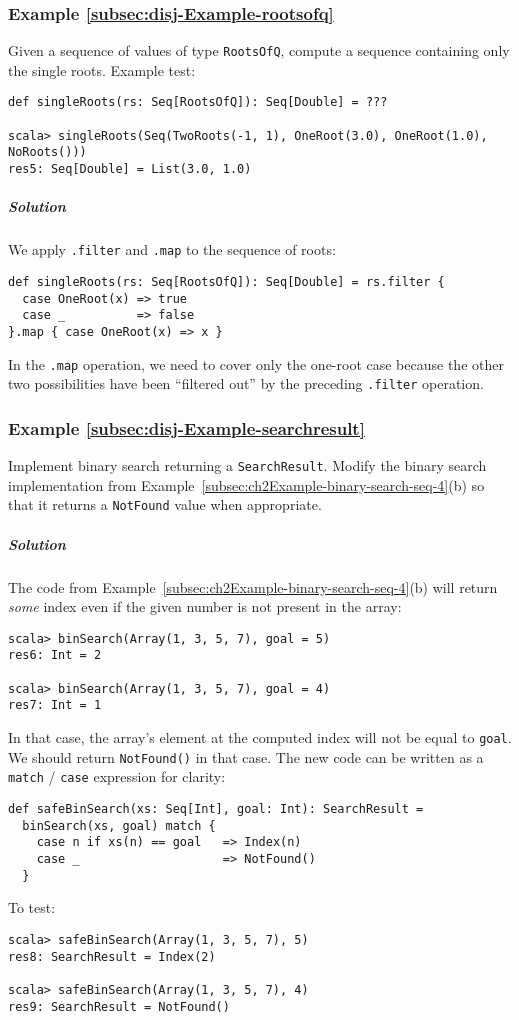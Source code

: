 \subsubsection{Example \label{subsec:disj-Example-rootsofq}\ref{subsec:disj-Example-rootsofq}}

Given a sequence of values of type \lstinline!RootsOfQ!, compute
a sequence containing only the single roots. Example test:
\begin{lstlisting}
def singleRoots(rs: Seq[RootsOfQ]): Seq[Double] = ???

scala> singleRoots(Seq(TwoRoots(-1, 1), OneRoot(3.0), OneRoot(1.0), NoRoots()))
res5: Seq[Double] = List(3.0, 1.0) 
\end{lstlisting}


\subparagraph{Solution}

We apply \lstinline!.filter! and \lstinline!.map! to the sequence
of roots:
\begin{lstlisting}
def singleRoots(rs: Seq[RootsOfQ]): Seq[Double] = rs.filter {
  case OneRoot(x) => true
  case _          => false
}.map { case OneRoot(x) => x }
\end{lstlisting}
In the \lstinline!.map! operation, we need to cover only the one-root
case because the other two possibilities have been ``filtered out''
by the preceding \lstinline!.filter! operation.

\subsubsection{Example \label{subsec:disj-Example-searchresult}\ref{subsec:disj-Example-searchresult}}

Implement binary search returning a \lstinline!SearchResult!. Modify
the binary search implementation from Example~\ref{subsec:ch2Example-binary-search-seq-4}(b)
so that it returns a \lstinline!NotFound! value when appropriate.

\subparagraph{Solution}

The code from Example~\ref{subsec:ch2Example-binary-search-seq-4}(b)
will return \emph{some} index even if the given number is not present
in the array: 
\begin{lstlisting}
scala> binSearch(Array(1, 3, 5, 7), goal = 5)
res6: Int = 2

scala> binSearch(Array(1, 3, 5, 7), goal = 4)
res7: Int = 1
\end{lstlisting}
In that case, the array's element at the computed index will not be
equal to \lstinline!goal!. We should return \lstinline!NotFound()!
in that case. The new code can be written as a \lstinline!match!
/ \lstinline!case! expression for clarity:
\begin{lstlisting}
def safeBinSearch(xs: Seq[Int], goal: Int): SearchResult =
  binSearch(xs, goal) match {
    case n if xs(n) == goal   => Index(n) 
    case _                    => NotFound()
  }
\end{lstlisting}
To test:
\begin{lstlisting}
scala> safeBinSearch(Array(1, 3, 5, 7), 5)
res8: SearchResult = Index(2)

scala> safeBinSearch(Array(1, 3, 5, 7), 4)
res9: SearchResult = NotFound()
\end{lstlisting}


